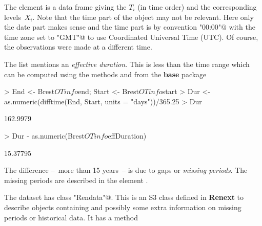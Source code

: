 \documentclass[a4paper]{report}
\begin{document}
\noindent
The \verb@OTdata@ element is a data frame giving the $T_i$ (in time
order) and the corresponding levels~$X_i$.  Note that the time part of
the \verb@POSIX@ object may not be relevant. Here only the date part
makes sense and the time part is by convention \verb@"00:00"@ with the
time zone set to \verb@"GMT"@ to use Coordinated Universal Time (UTC).
Of course, the observations were made at a different time.


The \verb@OTinfo@ list mentions an \textit{effective duration}. This
is less than the time range which can be computed using the methods
\verb@range@ and \verb@diff@ from the \textbf{base} package

\begin{Schunk}
\begin{Sinput}
> End <- Brest$OTinfo$end; Start <- Brest$OTinfo$start
> Dur <- as.numeric(difftime(End,  Start, units = "days"))/365.25
> Dur
\end{Sinput}
\begin{Soutput}
[1] 162.9979
\end{Soutput}
\begin{Sinput}
> Dur - as.numeric(Brest$OTinfo$effDuration) 
\end{Sinput}
\begin{Soutput}
[1] 15.37795
\end{Soutput}
\end{Schunk}

\noindent
The difference --~more than 15 
years~-- is due to gaps or \textit{missing periods}. 
%
The missing periods are described in the element \verb@OTmissing@.

The \verb@Brest@ dataset has class \verb@"Rendata"@. This is an S3 
class defined in \textbf{Renext} to describe objects containing
\verb@OTdata@ and possibly some extra information on missing periods
or historical data. It has a \verb@summary@ method 
\end{document}
